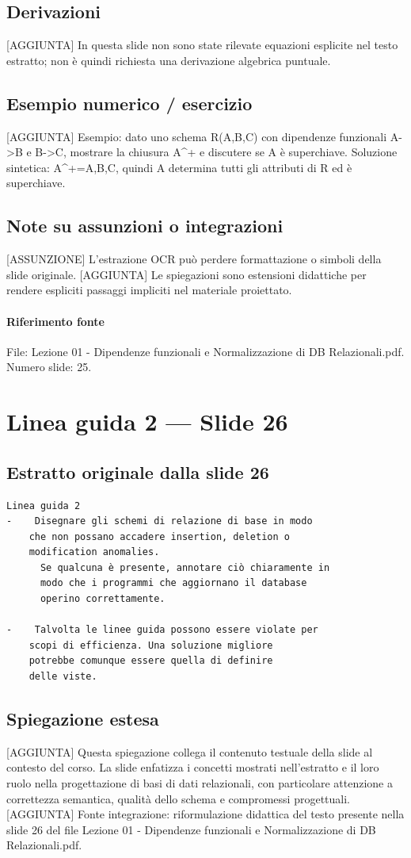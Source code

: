\documentclass[11pt]{article}
\begin{document}
\subsection*{Derivazioni}
[AGGIUNTA] In questa slide non sono state rilevate equazioni esplicite nel testo estratto; non è quindi richiesta una derivazione algebrica puntuale.
\subsection*{Esempio numerico / esercizio}
[AGGIUNTA] Esempio: dato uno schema R(A,B,C) con dipendenze funzionali A->B e B->C, mostrare la chiusura A^+ e discutere se A è superchiave. Soluzione sintetica: A^+={A,B,C}, quindi A determina tutti gli attributi di R ed è superchiave.
\subsection*{Note su assunzioni o integrazioni}
[ASSUNZIONE] L'estrazione OCR può perdere formattazione o simboli della slide originale.
[AGGIUNTA] Le spiegazioni sono estensioni didattiche per rendere espliciti passaggi impliciti nel materiale proiettato.
\paragraph{Riferimento fonte} File: Lezione 01 - Dipendenze funzionali e Normalizzazione di DB Relazionali.pdf. Numero slide: 25.
\section{Linea guida 2 --- Slide 26}
\subsection*{Estratto originale dalla slide 26}
\begin{lstlisting}
Linea guida 2
-    Disegnare gli schemi di relazione di base in modo
    che non possano accadere insertion, deletion o
    modification anomalies.
      Se qualcuna è presente, annotare ciò chiaramente in
      modo che i programmi che aggiornano il database
      operino correttamente.

-    Talvolta le linee guida possono essere violate per
    scopi di efficienza. Una soluzione migliore
    potrebbe comunque essere quella di definire
    delle viste.
\end{lstlisting}
\subsection*{Spiegazione estesa}
[AGGIUNTA] Questa spiegazione collega il contenuto testuale della slide al contesto del corso. La slide enfatizza i concetti mostrati nell'estratto e il loro ruolo nella progettazione di basi di dati relazionali, con particolare attenzione a correttezza semantica, qualità dello schema e compromessi progettuali.
[AGGIUNTA] Fonte integrazione: riformulazione didattica del testo presente nella slide 26 del file Lezione 01 - Dipendenze funzionali e Normalizzazione di DB Relazionali.pdf.
\end{document}
